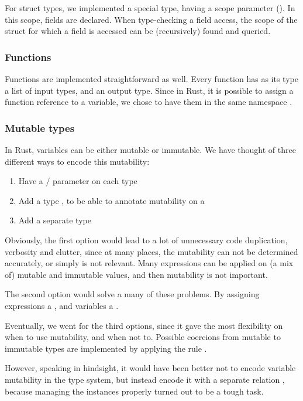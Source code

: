For struct types, we implemented a special type, having a scope parameter (). In this scope, fields are declared. When type-checking a field access, the scope of the struct for which a field is accessed can be (recursively) found and queried.

\subsubsection{Functions}

Functions are implemented straightforward as well. Every function has as its type a list of input types, and an output type. Since in Rust, it is possible to assign a function reference to a variable, we chose to have them in the same namespace .

\subsubsection{Mutable types}

In Rust, variables can be either mutable or immutable. We have thought of three different ways to encode this mutability:
\begin{enumerate}
    \item Have a / parameter on each type
    \item Add a type , to be able to annotate mutability on a 
    \item Add a separate type 
\end{enumerate}

Obviously, the first option would lead to a lot of unnecessary code duplication, verbosity and clutter, since at many places, the mutability can not be determined accurately, or simply is not relevant. Many expressions can be applied on (a mix of) mutable and immutable values, and then mutability is not important.

The second option would solve a many of these problems. By assigning expressions a , and variables a . 

Eventually, we went for the third options, since it gave the most flexibility on when to use mutability, and when not to. Possible coercions from mutable to immutable types are implemented by applying the rule .

However, speaking in hindsight, it would have been better not to encode variable mutability in the type system, but instead encode it with a separate relation , because managing the  instances properly turned out to be a tough task.


